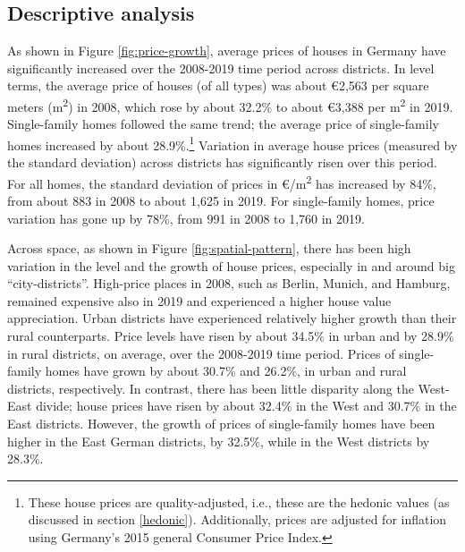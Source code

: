 \documentclass[
  12pt,
]{article}
\begin{document}
\subsection{Descriptive analysis}\label{descriptive-analysis}

As shown in Figure \ref{fig:price-growth}, average prices of houses in Germany have significantly increased over the 2008-2019 time period across districts. In level terms, the average price of houses (of all types) was about €2,563 per square meters (m\textsuperscript{2}) in 2008, which rose by about 32.2\% to about €3,388 per m\textsuperscript{2} in 2019. Single-family homes followed the same trend; the average price of single-family homes increased by about 28.9\%.\footnote{These house prices are quality-adjusted, i.e., these are the hedonic values (as discussed in section \ref{hedonic}). Additionally, prices are adjusted for inflation using Germany's 2015 general Consumer Price Index.} Variation in average house prices (measured by the standard deviation) across districts has significantly risen over this period. For all homes, the standard deviation of prices in €/m\textsuperscript{2} has increased by 84\%, from about 883 in 2008 to about 1,625 in 2019. For single-family homes, price variation has gone up by 78\%, from 991 in 2008 to 1,760 in 2019.

Across space, as shown in Figure \ref{fig:spatial-pattern}, there has been high variation in the level and the growth of house prices, especially in and around big ``city-districts''. High-price places in 2008, such as Berlin, Munich, and Hamburg, remained expensive also in 2019 and experienced a higher house value appreciation. Urban districts have experienced relatively higher growth than their rural counterparts. Price levels have risen by about 34.5\% in urban and by 28.9\% in rural districts, on average, over the 2008-2019 time period. Prices of single-family homes have grown by about 30.7\% and 26.2\%, in urban and rural districts, respectively. In contrast, there has been little disparity along the West-East divide; house prices have risen by about 32.4\% in the West and 30.7\% in the East districts. However, the growth of prices of single-family homes have been higher in the East German districts, by 32.5\%, while in the West districts by 28.3\%.
\end{document}
